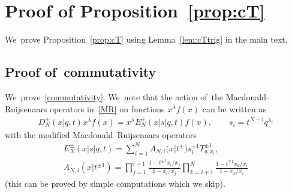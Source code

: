 \documentclass[pdftex]{sigma}%
\numberwithin{equation}{section}
\begin{document}
\section[Proof of Proposition~4.2]{Proof of Proposition~\ref{prop:cT}}\label{app:cT}
We~prove Proposition~\ref{prop:cT} using Lemma~\ref{lem:cTtrig} in the main text.

\subsection{Proof of~commutativity}
We~prove~\eqref{commutativity}. We~note that the action of~the Macdonald--Ruijsenaars operators in~\eqref{MR} on functions $x^\lambda f(x)$ can be written as \cite{NS}
\begin{gather}\label{cD}
D_N^\pm(x|q,t)x^\lambda f(x) = x^\lambda E^\pm_N(x|s|q,t)f(x) ,\qquad
s_i=t^{N-i}q^{\lambda_i}
\end{gather}
with the modified Macdonald--Ruijsenaars operators
\begin{gather}
\label{Edef}
E^\pm_N(x|s|q,t)= \sum_{i=1}^N A_{N,i}\big(x|t^{\pm }\big)s_i^{\pm 1}T_{q,x_i}^{\pm 1} ,
\\
\label{Adef}
A_{N,i}(x|t^{\pm 1}) = \prod_{j=1}^{i-1}\frac{1-t^{\pm1}x_i/x_j}{1-x_i/x_j} \prod_{k=i+1}^N\frac{1-t^{\mp 1}x_k/x_i}{1-x_k/x_i}
\end{gather}
(this can be proved by simple computations which we skip).
\end{document}
